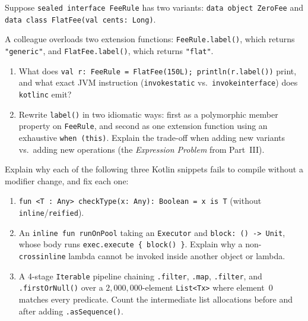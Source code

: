 \begin{exercise}
\label{ex:ch10-dispatch-puzzle}
Suppose \texttt{sealed interface FeeRule} has two variants: \texttt{data object ZeroFee} and \texttt{data class FlatFee(val cents: Long)}.

A colleague overloads two extension functions:
\texttt{FeeRule.label()}, which returns \texttt{"generic"}, and
\texttt{FlatFee.label()}, which returns \texttt{"flat"}.
\begin{enumerate}
  \item What does \texttt{val r: FeeRule = FlatFee(150L); println(r.label())} print, and what exact JVM instruction (\texttt{invokestatic} vs.\ \texttt{invokeinterface}) does \texttt{kotlinc} emit?
  \item Rewrite \texttt{label()} in two idiomatic ways: first as a polymorphic member property on \texttt{FeeRule}, and second as one extension function using an exhaustive \texttt{when (this)}. Explain the trade-off when adding new variants vs.\ adding new operations (the \emph{Expression Problem} from Part~III).
\end{enumerate}
\end{exercise}

\begin{exercise}
\label{ex:ch10-inline-reified}
Explain why each of the following three Kotlin snippets fails to compile without a modifier change, and fix each one:
\begin{enumerate}
  \item \texttt{fun <T : Any> checkType(x: Any): Boolean = x is T} (without \texttt{inline}/\texttt{reified}).
  \item An \texttt{inline fun runOnPool} taking an \texttt{Executor} and \texttt{block: () -> Unit}, whose body runs \texttt{exec.execute \{ block() \}}. Explain why a non-\texttt{crossinline} lambda cannot be invoked inside another object or lambda.
  \item A 4-stage \texttt{Iterable} pipeline chaining \texttt{.filter}, \texttt{.map}, \texttt{.filter}, and \texttt{.firstOrNull()} over a $2{,}000{,}000$-element \texttt{List<Tx>} where element~0 matches every predicate. Count the intermediate list allocations before and after adding \texttt{.asSequence()}.
\end{enumerate}
\end{exercise}

